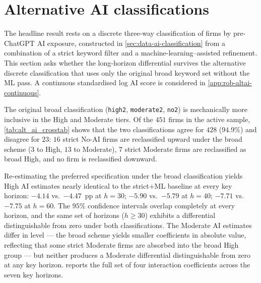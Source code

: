\section{Alternative AI classifications}
\label{sec:rob-altai}

The headline result rests on a discrete three-way classification of
firms by pre-ChatGPT AI exposure, constructed in
\cref{sec:data-ai-classification} from a combination of a strict
keyword filter and a machine-learning--assisted refinement. This
section asks whether the long-horizon differential survives the
alternative discrete classification that uses only the original broad
keyword set without the ML pass. A continuous standardised log AI
score is considered in \cref{app:rob-altai-continuous}.

The original broad classification (\texttt{high2}, \texttt{moderate2},
\texttt{no2}) is mechanically more inclusive in the High and Moderate
tiers. Of the $451$ firms in the active sample,
\cref{tab:alt_ai_crosstab} shows that the two classifications agree
for $428$ ($94.9\%$) and disagree for $23$: $16$ strict No-AI firms
are reclassified upward under the broad scheme ($3$ to High, $13$ to
Moderate), $7$ strict Moderate firms are reclassified as broad High,
and no firm is reclassified downward.

\begin{table}[htbp]
\centering\small

\end{table}

Re-estimating the preferred specification under the broad
classification yields High AI estimates nearly identical to the
strict$+$ML baseline at every key horizon: $-4.14$ vs.\ $-4.47$~pp
at $h = 30$; $-5.90$ vs.\ $-5.79$ at $h = 40$; $-7.71$ vs.\ $-7.75$
at $h = 60$. The $95\%$ confidence intervals overlap completely at
every horizon, and the same set of horizons ($h \geq 30$) exhibits a
differential distinguishable from zero under both classifications.
The Moderate AI estimates differ in level --- the broad scheme
yields smaller coefficients in absolute value, reflecting that some
strict Moderate firms are absorbed into the broad High group --- but
neither produces a Moderate differential distinguishable from zero
at any key horizon.  reports the full set of
four interaction coefficients across the seven key horizons.

\begin{table}[htbp]
\centering\small
\caption[Strict$+$ML versus original broad classification: key-horizon
estimates]{Strict$+$ML versus original broad classification:
key-horizon estimates}
\label{tab:alt_ai_key}

\end{table}

